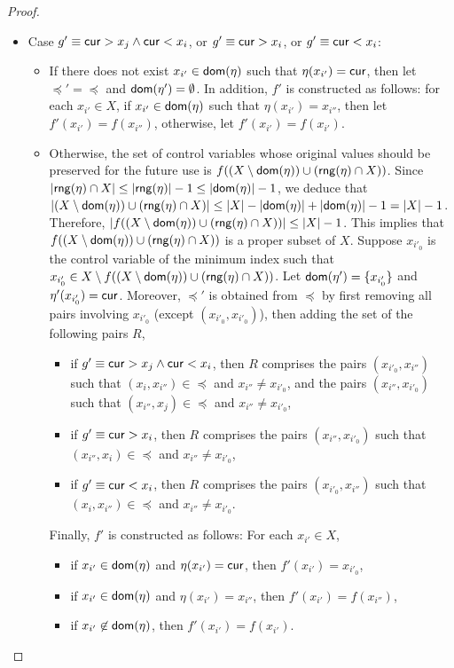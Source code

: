 \begin{appendix}
{\begin{proof}
\begin{itemize}
\begin{itemize}
\item Case $g' \equiv \mathsf{cur} > x_j \wedge \mathsf{cur} < x_i$, or $g' \equiv  \mathsf{cur} > x_i$, or $g' \equiv \mathsf{cur} < x_i$:
\begin{itemize}
\item If there does not exist $x_{i'} \in \mathsf{dom}(\eta)$ such that $\eta(x_{i'})=\mathsf{cur}$, then let $\preceq' = \preceq$ and $\mathsf{dom}(\eta')=\emptyset$. In addition, $f'$ is constructed as follows: for each $x_{i'} \in X$, if $x_{i'} \in \mathsf{dom}(\eta)$ such that $\eta(x_{i'})=x_{i''}$, then let $f'(x_{i'})=f(x_{i''})$, otherwise, let $f'(x_{i'})=f(x_{i'})$.
%
\item Otherwise, the set of control variables whose original values should be preserved for the future use is $f((X \setminus \mathsf{dom}(\eta))  \cup (\mathsf{rng}(\eta) \cap X))$. Since $|\mathsf{rng}(\eta) \cap X| \le |\mathsf{rng}(\eta)|-1 \le |\mathsf{dom}(\eta)|-1$, we deduce that $|(X \setminus \mathsf{dom}(\eta))  \cup (\mathsf{rng}(\eta) \cap X)| \le |X|- |\mathsf{dom}(\eta)| +|\mathsf{dom}(\eta)|-1 = |X|-1$. Therefore, $|f((X \setminus \mathsf{dom}(\eta))  \cup (\mathsf{rng}(\eta) \cap X))| \le |X|-1$.
This implies that $f((X \setminus \mathsf{dom}(\eta))  \cup (\mathsf{rng}(\eta) \cap X))$ is a proper subset of $X$. Suppose $x_{i'_0}$ is the control variable of the minimum index such that $x_{i'_0} \in X \setminus f((X \setminus \mathsf{dom}(\eta))  \cup (\mathsf{rng}(\eta) \cap X))$. Let $\mathsf{dom}(\eta')=\{x_{i'_0}\}$ and $\eta'(x_{i'_0})=\mathsf{cur}$. Moreover, $\preceq'$ is obtained from $\preceq$ by first removing all pairs involving $x_{i'_0}$ (except $(x_{i'_0}, x_{i'_0})$), then adding the set of the following pairs $R$,
\begin{itemize}
\item if $g' \equiv \mathsf{cur} > x_j \wedge \mathsf{cur} < x_i$, then $R$ comprises the pairs $(x_{i'_0}, x_{i''})$ such that $(x_i, x_{i''}) \in \preceq$ and $x_{i''} \neq x_{i'_0}$, and the pairs $(x_{i''}, x_{i'_0})$ such that $(x_{i''}, x_j) \in \preceq$ and $x_{i''} \neq x_{i'_0}$,
%
\item if $g' \equiv \mathsf{cur} > x_i$, then $R$ comprises the pairs $(x_{i''}, x_{i'_0})$ such that $(x_{i''}, x_i) \in \preceq$ and $x_{i''} \neq x_{i'_0}$,
%
\item  if $g' \equiv \mathsf{cur} < x_i$, then $R$ comprises the pairs $(x_{i'_0}, x_{i''})$ such that $(x_i, x_{i''}) \in \preceq$ and $x_{i''} \neq x_{i'_0}$.
\end{itemize}
Finally, $f'$ is constructed as follows:
For each $x_{i'} \in X$, 
\begin{itemize}
\item if $x_{i'} \in \mathsf{dom}(\eta)$ and $\eta(x_{i'}) = \mathsf{cur}$, then $f'(x_{i'}) = x_{i'_0}$, 
%
\item if $x_{i'} \in \mathsf{dom}(\eta)$ and $\eta(x_{i'}) = x_{i''}$, then $f'(x_{i'})=f(x_{i''})$,
%
\item if $x_{i'} \not \in \mathsf{dom}(\eta)$, then $f'(x_{i'})=f(x_{i'})$.
\end{itemize}
%
\end{itemize}
\end{itemize}
%
%
\end{itemize}


\end{proof}}
\end{appendix}
